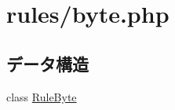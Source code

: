 \hypertarget{byte_8php}{
\section{rules/byte.php}
\label{byte_8php}
}
\subsection*{データ構造}
\begin{DoxyCompactItemize}
\item 
class \hyperlink{class_rule_byte}{\-Rule\-Byte}
\end{DoxyCompactItemize}
